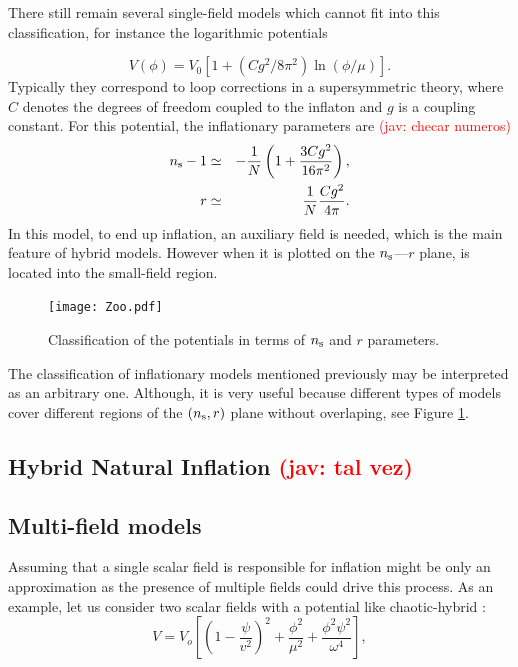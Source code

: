 \documentclass{rmaa}
\def\beq{\begin{equation}}
\def\eeq{\end{equation}}
\def\bea{\begin{eqnarray}}
\def\eea{\end{eqnarray}}
\newcommand{\jav}[1]{\textcolor{red}{(jav: #1)}}
\begin{document}
There still remain several single-field models which cannot fit into this classification, 
for instance the logarithmic potentials \citep{Barrow2}

\beq
V\left(\phi\right) =V_0\left[1+(C g^2/8\pi^2)
\ln\left(\phi/\mu\right)\right].
\eeq
%
Typically they correspond to loop corrections in a supersymmetric theory,
where $C$ denotes the degrees of freedom coupled
to the inflaton and $g$ is a coupling constant.  
%
For this potential, the inflationary parameters are \jav{checar numeros}
%
\bea
n_{\rm s}-1&\simeq& -\frac{1}{N}\left(1+\frac{3C g^2}{16 \pi^2}\right), \nonumber \\
r&\simeq& \frac{1}{N}{Cg^2\over 4\pi}.
 \eea
%
In this model, to end up inflation, an auxiliary field is needed, which is the main feature of
hybrid models. However when it is plotted on the $n_{\rm s}$---$r$ plane, is located into the
small-field region.
\\

\begin{figure}[t!]
\begin{center}
  \texttt{[image: Zoo.pdf]}
	\caption{Classification of the
potentials in terms of $n_{\rm s}$ and $r$ parameters. }
\label{fig:parameters}
\end{center}
\end{figure}

The classification of inflationary models mentioned previously may be interpreted as an 
arbitrary one. Although, it is very useful because different types of models cover different 
regions of the $(n_{\rm s}, r)$ plane without overlaping, see Figure \ref{fig:parameters}.


\subsection{Hybrid Natural Inflation \jav{tal vez}}


\subsection{Multi-field models}

Assuming that a single scalar field is responsible for inflation might be only
an approximation as the presence of multiple fields could drive this process.
As an example, let us consider two scalar fields with  a potential like
 chaotic-hybrid :
\begin{equation}
V=V_o\left[\left(1-\frac{\psi}{v^2}\right)^2+\frac{\phi^2}{\mu^2}+\frac{\phi^2\psi^2}{\omega^4}\right],
\end{equation}
\end{document}
